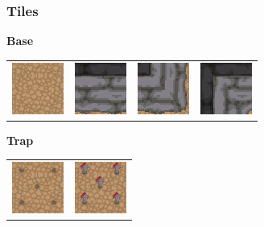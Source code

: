 \documentclass[../Main.tex]{subfiles}
\begin{document}
        \subsubsection{Tiles}
            \textbf{Base}
            \begin{center}
                \begin{tabular}{ m{} m{} m{} m{} }
                    \centerline{\includegraphics[scale=1]{../res/textures/tiles/Floor.png}} & \centerline{\includegraphics[scale=1]{../res/textures/tiles/Wall.png}} & \centerline{\includegraphics[scale=1]{../res/textures/tiles/ExternalCorner.png}} & \centerline{\includegraphics[scale=1]{../res/textures/tiles/InternalCorner.png}}\\
                \end{tabular}
            \end{center}
            \textbf{Trap}
            \begin{center}
                \begin{tabular}{ m{} m{} }
                    \centerline{\includegraphics[scale=4]{../res/textures/tiles/BasicTrap.png}} & \centerline{\includegraphics[scale=4]{../res/textures/tiles/BasicTrapExposed.png}}\\
                \end{tabular}
            \end{center}
\end{document}
